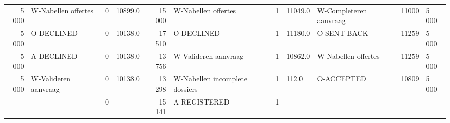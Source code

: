 \begin{tabular}{rlrlrlrllll}
5 000 & W-Nabellen offertes & 0 & 10899.0 & 15 000 & W-Nabellen offertes & 1 & 11049.0 & W-Completeren aanvraag & 11000 & 5 000 \\
5 000 & O-DECLINED & 0 & 10138.0 & 17 510 & O-DECLINED & 1 & 11180.0 & O-SENT-BACK & 11259 & 5 000 \\
5 000 & A-DECLINED & 0 & 10138.0 & 13 756 & W-Valideren aanvraag & 1 & 10862.0 & W-Nabellen offertes & 11259 & 5 000 \\
5 000 & W-Valideren aanvraag & 0 & 10138.0 & 13 298 & W-Nabellen incomplete dossiers & 1 & 112.0 & O-ACCEPTED & 10809 & 5 000 \\
 &  & 0 &  & 15 141 & A-REGISTERED & 1 &  &  &  &  \\
\bottomrule
\end{tabular}
